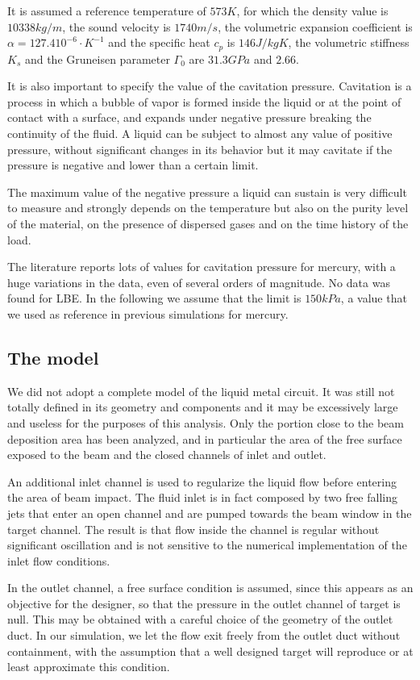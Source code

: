 \documentclass[a4paper, 11pt, twocolumn]{article}
\begin{document}
It is assumed a reference temperature of $573K$, for which the density value is $10338kg/m$, the sound velocity is $1740m/s$, the volumetric expansion coefficient is $\alpha = 127.4 10^{-6} \cdot K^{-1}$ and the specific heat $c_p$ is $146J/kgK$, the volumetric stiffness $K_s$ and the Gruneisen parameter $\Gamma_0$ are $31.3GPa$ and $2.66$.

It is also important to specify the value of the cavitation pressure. Cavitation is a process in which a bubble of vapor is formed inside the liquid or at the point of contact with a surface, and expands under negative pressure breaking the continuity of the fluid. A liquid can be subject to almost any value of positive pressure, without significant changes in its behavior but it may cavitate if the pressure is negative and lower than a certain limit.

The maximum value of the negative pressure a liquid can sustain is very difficult to measure and strongly depends  on the temperature but also on the purity level of the material, on the presence of dispersed gases and on the time history of the load.

The literature reports lots of values for cavitation pressure for mercury, with a huge variations in the data, even of several orders of magnitude. No data was found for LBE. In the following we assume that the limit is $150kPa$, a value that we used as reference in previous simulations for mercury.

\subsection{The model}
We did not adopt a complete model of the liquid metal circuit. It was still not totally defined in its geometry and components and it may be excessively large and useless for the purposes of this analysis. Only the portion close to the beam deposition area has been analyzed, and in particular the area of the free surface exposed to the beam and the closed channels of inlet and outlet.

An additional inlet channel is used to regularize the liquid flow before entering the area of beam impact. The fluid inlet is in fact composed by two free falling jets that enter an open channel and are pumped towards the beam window in the target channel. The result is that flow inside the channel is regular without significant oscillation and is not sensitive to the numerical implementation of the inlet flow conditions.

In the outlet channel, a free surface condition is assumed, since this appears as an objective for the designer, so that the pressure in the outlet channel of target is null. This may be obtained with a careful choice of the geometry of the outlet duct. In our simulation, we let the flow exit freely from the outlet duct without containment, with the assumption that a well designed target will reproduce or at least approximate this condition.
\end{document}

